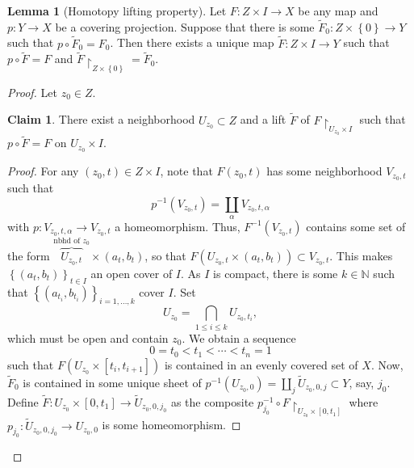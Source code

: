 \documentclass[10pt,letterpaper,cm]{nupset}
\theoremstyle{definition}
\theoremstyle{theorem}
\newtheorem{lemma}[definition]{Lemma}
\newtheorem*{claim}{Claim}
\theoremstyle{remark}
\newcommand{\N}{\mathbb N}
\newcommand{\1}{\mathbb{1}}
\newcommand{\0}{\vec 0}
\begin{document}
\begin{lemma}[Homotopy lifting property]\label{HLP}
Let $F : Z \times I \to X$ be any map and $p: Y \to X$ be a covering projection. Suppose that there is some $\widetilde{F}_0 : Z \times \left\{0\right\} \to Y$ such that $p \circ \widetilde{F}_0 = F_0$. Then there exists a unique map $\widetilde{F} : Z \times I \to Y$ such that $p \circ \widetilde{F} = F$ and $\widetilde{F} \restriction_{Z\times \left\{0\right\}} = \widetilde{F}_0$.
\end{lemma}
\begin{proof}
Let $z_0\in Z$.
\begin{claim} There exist a neighborhood $U_{z_0}\subset Z$ and a lift $\widetilde{F}$ of $F\restriction_{U_{z_0}\times I}$ such that $p \circ \widetilde{F} = F$ on $U_{z_0}\times I$.
\end{claim}
\begin{proof}
For any $\left(z_0, t\right) \in Z \times I$, note that $F(z_0, t)$ has some neighborhood $V_{z_0,t}$ such that $$p^{-1}(V_{z_0, t}) = \coprod_{\alpha} V_{z_0,t, \alpha}$$ with $p: V_{z_0, t, \alpha} \to V_{z_0, t}$ a homeomorphism. Thus, $F^{-1}(V_{z_0, t})$ contains some set of the form $\overbrace{U_{z_0, t}}^{\text{nbhd of } z_0} \times \left(a_t, b_t\right)$, so that $F(U_{z_0, t}  \times (a_t, b_t)) \subset V_{z_0, t} $. This makes $\left\{\left(a_t, b_t\right)\right\}_{t\in I}$ an open cover of $I$. As $I$ is compact, there is some $k\in \N$ such that $\left\{(a_{t_i}, b_{t_i})\right\}_{i=1, \ldots, k}$  cover $I$. Set $$U_{z_0} = \bigcap_{1\leq i \leq k} U_{z_0, t_i},$$ which must be  open and contain $z_0$. We obtain a sequence $$ 0= t_0 < t_1 < \cdots < t_n =1 $$ such that $F(U_{z_0} \times [t_i, t_{i+1}])$ is contained in an evenly covered set of $X$. 
Now, $\widetilde{F}_0 $ is contained in some unique sheet of $p^{-1}(U_{z_0, 0}) =\coprod_j \widetilde{U}_{z_0, 0, j} \subset Y$, say, $j_0$. Define $\widetilde{F} : U_{z_0} \times \left[0, t_1\right] \to \widetilde{U}_{z_0, 0, j_0}$ as the composite $p^{-1}_{j_0} \circ F \restriction_{U_{z_0} \times \left[0, t_1\right]}$ where $p_{j_0} : \widetilde{U}_{z_0, 0, j_0} \to U_{z_0, 0}$ is some homeomorphism.

\medskip


\end{proof}
\end{proof}
\end{document}
